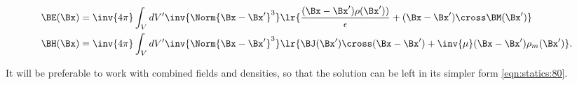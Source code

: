 \begin{dmath}\label{eqn:statics:100}
\begin{aligned}
\BE(\Bx)
&=
\inv{4\pi} \int_V dV' \inv{\Norm{\Bx - \Bx'}^3}
\lr{
   \frac{(\Bx - \Bx') \rho(\Bx'))}{\epsilon}
   + 
   (\Bx - \Bx') \cross \BM(\Bx') 
} \\
\BH(\Bx)
&=
\inv{4\pi} \int_V dV' \inv{\Norm{\Bx - \Bx'}^3}
\lr{
  \BJ(\Bx') \cross (\Bx - \Bx')
+ \inv{\mu} (\Bx - \Bx') \rho_m(\Bx')
}.
\end{aligned}
\end{dmath}

It will be preferable to work with combined fields and densities, so that the solution can be left in its simpler form \cref{eqn:statics:80}.

